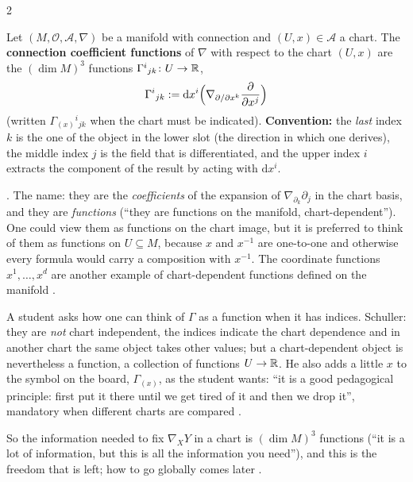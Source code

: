 \begin{paracol}{2}
\begin{definition}\label{def:c07-gamma}
Let $(M,\mathcal O,\mathcal A,\nabla)$ be a manifold with connection and $(U,x)\in\mathcal A$ a chart. The \textbf{connection coefficient functions} of $\nabla$ with respect to the chart $(U,x)$ are the $(\dim M)^3$ functions $\Gamma^i{}_{jk}\colon U\to\mathbb{R}$,
\[
  \Gamma^i{}_{jk}:=\mathrm dx^i\Bigl(\nabla_{\partial/\partial x^k}\frac{\partial}{\partial x^j}\Bigr)
\]
(written $\Gamma_{(x)}{}^i{}_{jk}$ when the chart must be indicated). \textbf{Convention:} the \emph{last} index $k$ is the one of the object in the lower slot (the direction in which one derives), the middle index $j$ is the field that is differentiated, and the upper index $i$ extracts the component of the result by acting with $\mathrm dx^i$.
\end{definition}
.
The name: they are the \emph{coefficients} of the expansion of $\nabla_{\partial_k}\partial_j$ in the chart basis, and they are \emph{functions} (``they are functions on the manifold, chart-dependent''). One could view them as functions on the chart image, but it is preferred to think of them as functions on $U\subseteq M$, because $x$ and $x^{-1}$ are one-to-one and otherwise every formula would carry a composition with $x^{-1}$. The coordinate functions $x^1,\dots,x^d$ are another example of chart-dependent functions defined on the manifold
.
\begin{coursenote}
A student asks how one can think of $\Gamma$ as a function when it has indices. Schuller: they are \emph{not} chart independent, the indices indicate the chart dependence and in another chart the same object takes other values; but a chart-dependent object is nevertheless a function, a collection of functions $U\to\mathbb{R}$. He also adds a little $x$ to the symbol on the board, $\Gamma_{(x)}$, as the student wants: ``it is a good pedagogical principle: first put it there until we get tired of it and then we drop it'', mandatory when different charts are compared
.
\end{coursenote}

So the information needed to fix $\nabla_XY$ in a chart is $(\dim M)^3$ functions (``it is a lot of information, but this is all the information you need''), and this is the freedom that is left; how to go globally comes later .


\end{paracol}
